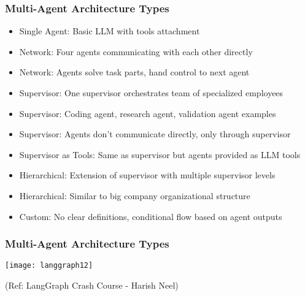 \begin{frame}[fragile]\frametitle{Multi-Agent Architecture Types}
      \begin{itemize}
          \item Single Agent: Basic LLM with tools attachment
          \item Network: Four agents communicating with each other directly
          \item Network: Agents solve task parts, hand control to next agent
          \item Supervisor: One supervisor orchestrates team of specialized employees
          \item Supervisor: Coding agent, research agent, validation agent examples
          \item Supervisor: Agents don't communicate directly, only through supervisor
          \item Supervisor as Tools: Same as supervisor but agents provided as LLM tools
          \item Hierarchical: Extension of supervisor with multiple supervisor levels
          \item Hierarchical: Similar to big company organizational structure
          \item Custom: No clear definitions, conditional flow based on agent outputs
      \end{itemize}
\end{frame}

\begin{frame}[fragile]\frametitle{Multi-Agent Architecture Types}

\begin{center}
\texttt{[image: langgraph12]}

{\tiny (Ref: LangGraph Crash Course - Harish Neel)}

\end{center}	  


\end{frame}


